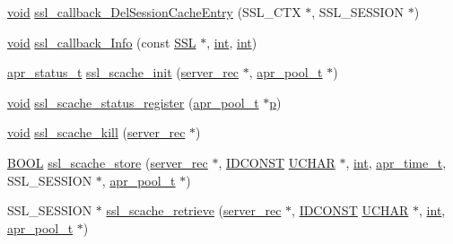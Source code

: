 \begin{DoxyCompactItemize}
\item 
\hyperlink{group__MOD__ISAPI_gacd6cdbf73df3d9eed42fa493d9b621a6}{void} \hyperlink{group__MOD__SSL__PRIVATE_gabe946dabe2632af16a7eec23d59d398f}{ssl\+\_\+callback\+\_\+\+Del\+Session\+Cache\+Entry} (S\+S\+L\+\_\+\+C\+TX $\ast$, S\+S\+L\+\_\+\+S\+E\+S\+S\+I\+ON $\ast$)
\item 
\hyperlink{group__MOD__ISAPI_gacd6cdbf73df3d9eed42fa493d9b621a6}{void} \hyperlink{group__MOD__SSL__PRIVATE_gaad15af9d93ac03e2acdbe6a8d1d76adb}{ssl\+\_\+callback\+\_\+\+Info} (const \hyperlink{group__MOD__SSL_gac05889312301718b3fc106564942ad68}{S\+SL} $\ast$, \hyperlink{pcre_8txt_a42dfa4ff673c82d8efe7144098fbc198}{int}, \hyperlink{pcre_8txt_a42dfa4ff673c82d8efe7144098fbc198}{int})
\item 
\hyperlink{group__apr__errno_gaa5105fa83cc322f09382292db8b47593}{apr\+\_\+status\+\_\+t} \hyperlink{group__MOD__SSL__PRIVATE_ga5183bc9b295a527c7655a61ce122ef1b}{ssl\+\_\+scache\+\_\+init} (\hyperlink{structserver__rec}{server\+\_\+rec} $\ast$, \hyperlink{structapr__pool__t}{apr\+\_\+pool\+\_\+t} $\ast$)
\item 
\hyperlink{group__MOD__ISAPI_gacd6cdbf73df3d9eed42fa493d9b621a6}{void} \hyperlink{group__MOD__SSL__PRIVATE_ga887ca284c503b54bddae137998449df2}{ssl\+\_\+scache\+\_\+status\+\_\+register} (\hyperlink{structapr__pool__t}{apr\+\_\+pool\+\_\+t} $\ast$\hyperlink{group__APACHE__CORE__MPM_ga5cd91701e5c167f2b1a38e70ab57817e}{p})
\item 
\hyperlink{group__MOD__ISAPI_gacd6cdbf73df3d9eed42fa493d9b621a6}{void} \hyperlink{group__MOD__SSL__PRIVATE_ga1010064b8c443d70cd9df4db7d8ebd1f}{ssl\+\_\+scache\+\_\+kill} (\hyperlink{structserver__rec}{server\+\_\+rec} $\ast$)
\item 
\hyperlink{pcre__internal_8h_a050c65e107f0c828f856a231f4b4e788}{B\+O\+OL} \hyperlink{group__MOD__SSL__PRIVATE_ga2f1dd17002a51792871646382b10f72d}{ssl\+\_\+scache\+\_\+store} (\hyperlink{structserver__rec}{server\+\_\+rec} $\ast$, \hyperlink{group__MOD__SSL__PRIVATE_ga7b2aaacd57801ee8b4692b1699a1b1bd}{I\+D\+C\+O\+N\+ST} \hyperlink{group__MOD__SSL__PRIVATE_ga9a1dc6d243c6f75bb42f87e3f69649e4}{U\+C\+H\+AR} $\ast$, \hyperlink{pcre_8txt_a42dfa4ff673c82d8efe7144098fbc198}{int}, \hyperlink{group__apr__time_gadb4bde16055748190eae190c55aa02bb}{apr\+\_\+time\+\_\+t}, S\+S\+L\+\_\+\+S\+E\+S\+S\+I\+ON $\ast$, \hyperlink{structapr__pool__t}{apr\+\_\+pool\+\_\+t} $\ast$)
\item 
S\+S\+L\+\_\+\+S\+E\+S\+S\+I\+ON $\ast$ \hyperlink{group__MOD__SSL__PRIVATE_ga8af03ed4b01826deda49fb57e648786e}{ssl\+\_\+scache\+\_\+retrieve} (\hyperlink{structserver__rec}{server\+\_\+rec} $\ast$, \hyperlink{group__MOD__SSL__PRIVATE_ga7b2aaacd57801ee8b4692b1699a1b1bd}{I\+D\+C\+O\+N\+ST} \hyperlink{group__MOD__SSL__PRIVATE_ga9a1dc6d243c6f75bb42f87e3f69649e4}{U\+C\+H\+AR} $\ast$, \hyperlink{pcre_8txt_a42dfa4ff673c82d8efe7144098fbc198}{int}, \hyperlink{structapr__pool__t}{apr\+\_\+pool\+\_\+t} $\ast$)

\end{DoxyCompactItemize}
